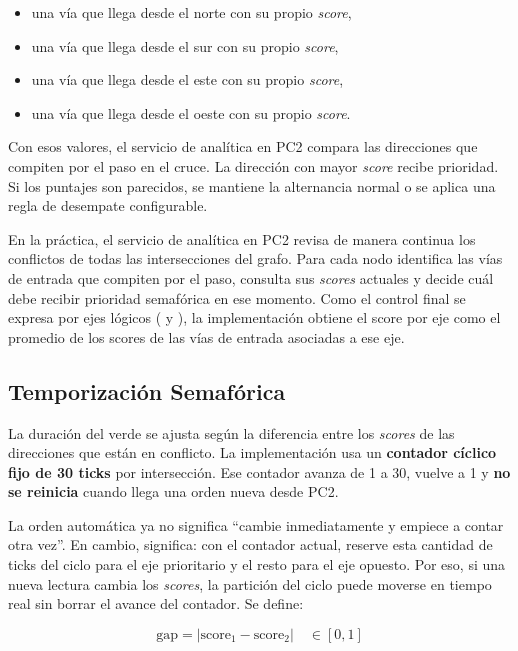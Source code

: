 \documentclass[12pt, a4paper]{article}
\let\oldtexttt\texttt
\renewcommand{\texttt}[1]{\oldtexttt{\seqsplit{#1}}}
\begin{document}
\begin{itemize}
    \item una vía que llega desde el norte con su propio \textit{score},
    \item una vía que llega desde el sur con su propio \textit{score},
    \item una vía que llega desde el este con su propio \textit{score},
    \item una vía que llega desde el oeste con su propio \textit{score}.
\end{itemize}

Con esos valores, el servicio de analítica en PC2 compara las direcciones que compiten por el paso en el cruce. La dirección con mayor \textit{score} recibe prioridad. Si los puntajes son parecidos, se mantiene la alternancia normal o se aplica una regla de desempate configurable.

En la práctica, el servicio de analítica en PC2 revisa de manera continua los conflictos de todas las intersecciones del grafo. Para cada nodo identifica las vías de entrada que compiten por el paso, consulta sus \textit{scores} actuales y decide cuál debe recibir prioridad semafórica en ese momento. Como el control final se expresa por ejes lógicos (\texttt{HORIZONTAL} y \texttt{VERTICAL}), la implementación obtiene el score por eje como el promedio de los scores de las vías de entrada asociadas a ese eje.

\subsection{Temporización Semafórica}

La duración del verde se ajusta según la diferencia entre los \textit{scores} de las direcciones que están en conflicto. La implementación usa un \textbf{contador cíclico fijo de 30 ticks} por intersección. Ese contador avanza de 1 a 30, vuelve a 1 y \textbf{no se reinicia} cuando llega una orden nueva desde PC2.

La orden automática ya no significa ``cambie inmediatamente y empiece a contar otra vez''. En cambio, significa: con el contador actual, reserve esta cantidad de ticks del ciclo para el eje prioritario y el resto para el eje opuesto. Por eso, si una nueva lectura cambia los \textit{scores}, la partición del ciclo puede moverse en tiempo real sin borrar el avance del contador. Se define:

$$\text{gap} = |\text{score}_1 - \text{score}_2| \quad \in [0, 1]$$
\end{document}
